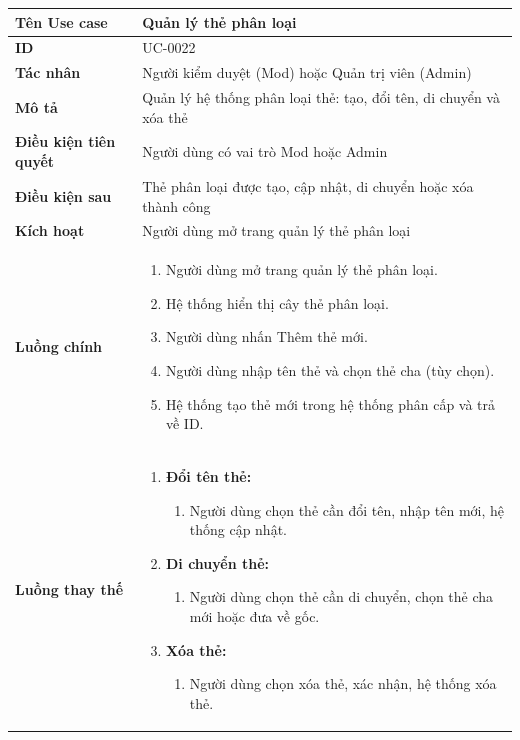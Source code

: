 {
\renewcommand{\arraystretch}{1.5}

\begin{tabularx}{\textwidth}{|>{\raggedright\arraybackslash}X|>{\raggedright\arraybackslash}X|}
\hline
\textbf{Tên Use case} & Quản lý thẻ phân loại \\
\hline
\textbf{ID} & UC-0022 \\
\hline
\textbf{Tác nhân} & Người kiểm duyệt (Mod) hoặc Quản trị viên (Admin) \\
\hline
\textbf{Mô tả} & Quản lý hệ thống phân loại thẻ: tạo, đổi tên, di chuyển và xóa thẻ \\
\hline
\textbf{Điều kiện tiên quyết} & Người dùng có vai trò Mod hoặc Admin \\
\hline
\textbf{Điều kiện sau} & Thẻ phân loại được tạo, cập nhật, di chuyển hoặc xóa thành công \\
\hline
\textbf{Kích hoạt} & Người dùng mở trang quản lý thẻ phân loại \\
\hline
\textbf{Luồng chính} &
\begin{enumerate}
    \item Người dùng mở trang quản lý thẻ phân loại.
    \item Hệ thống hiển thị cây thẻ phân loại.
    \item Người dùng nhấn Thêm thẻ mới.
    \item Người dùng nhập tên thẻ và chọn thẻ cha (tùy chọn).
    \item Hệ thống tạo thẻ mới trong hệ thống phân cấp và trả về ID.
\end{enumerate} \\
\hline
\textbf{Luồng thay thế} &
\begin{enumerate}
    \item \textbf{Đổi tên thẻ:}
    \begin{enumerate}
        \item[3A.] Người dùng chọn thẻ cần đổi tên, nhập tên mới, hệ thống cập nhật.
    \end{enumerate}
    \item \textbf{Di chuyển thẻ:}
    \begin{enumerate}
        \item[3B.] Người dùng chọn thẻ cần di chuyển, chọn thẻ cha mới hoặc đưa về gốc.
    \end{enumerate}
    \item \textbf{Xóa thẻ:}
    \begin{enumerate}
        \item[3C.] Người dùng chọn xóa thẻ, xác nhận, hệ thống xóa thẻ.

\end{enumerate}
\end{enumerate}
\end{tabularx}}
